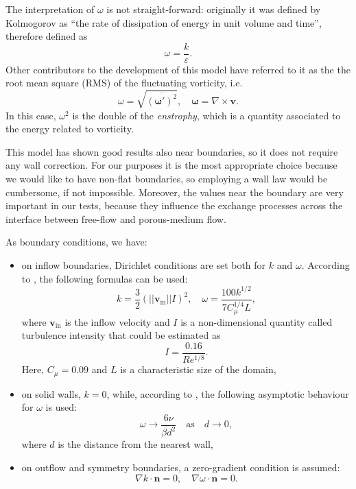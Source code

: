 The interpretation of $\omega$ is not straight-forward: originally it was 
defined by Kolmogorov as ``the rate of dissipation of energy in unit volume and 
time'', therefore defined as
\begin{equation}
	\omega = \frac{k}{\varepsilon}.
\end{equation}
Other contributors to the development of this model have referred to it as 
the the root mean square (RMS) of the fluctuating vorticity, i.e.
\begin{equation}
	\omega = \sqrt{\overline{ (\boldsymbol\omega ')^2 }}, \quad 
	\boldsymbol\omega = \nabla \times \mathbf{v}.
\end{equation}
In this case, $\omega^2$ is the double of the \emph{enstrophy}, which is a 
quantity associated to the energy related to vorticity.

This model has shown good results also near boundaries, so it does not 
require any wall correction. For our purposes it is the most appropriate choice 
because we would like to have non-flat boundaries, so employing a 
wall law would be cumbersome, if not impossible. Moreover, the values near the boundary are 
very important in our tests, because they influence the exchange processes 
across the interface between free-flow and porous-medium flow.

As boundary conditions, we have:
\begin{itemize}
	\item on inflow boundaries, Dirichlet conditions are set both for $k$ and 
	$\omega$. According to \cite{ko:ansys}, the following formulas can be used:
	\begin{equation} \label{eq:koic}
		k = \frac{3}{2} (|\!|\mathbf{v}_\text{in}|\!|	 I)^2, \quad \omega = 		
		\frac{100k^{1/2}}{7C_\mu^{1/4}L},
	\end{equation}
	where $\mathbf{v}_\text{in}$ is the inflow velocity and $I$ is a 
	non-dimensional quantity called turbulence intensity that could be 
	estimated as
	\begin{equation}
	I = \frac{0.16}{Re^{1/8}}.
	\end{equation}
	Here, $C_\mu=0.09$ and $L$ is a characteristic size of the domain,
	\item on solid walls, $k=0$, while, according to 
	\cite{main:wilcox}, the following asymptotic behaviour for $\omega$ is used:
	\begin{equation}
		\omega \rightarrow \frac{6 \nu}{\beta d^2} \quad \text{as} \quad d 
		\rightarrow 0,
	\end{equation}
	where $d$ is the distance from the nearest wall,
	\item on outflow and symmetry boundaries, a zero-gradient condition is 
	assumed:
	\begin{equation}
		\nabla k \cdot \mathbf{n} = 0, \quad \nabla \omega \cdot \mathbf{n} = 0.
	\end{equation}
\end{itemize}
%
